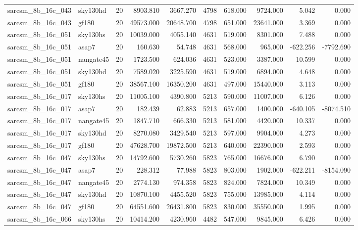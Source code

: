 \begin{longtable}{llrrrrrrrr}
sarcsm\_8b\_16c\_043 & sky130hd & 20 & 8903.810 & 3667.270 & 4798 & 618.000 & 9724.000 & 5.042 & 0.000 \\
sarcsm\_8b\_16c\_043 & gf180 & 20 & 49573.000 & 20648.700 & 4798 & 651.000 & 23641.000 & 3.369 & 0.000 \\
sarcsm\_8b\_16c\_051 & sky130hs & 20 & 10039.000 & 4055.140 & 4631 & 519.000 & 8301.000 & 7.488 & 0.000 \\
sarcsm\_8b\_16c\_051 & asap7 & 20 & 160.630 & 54.748 & 4631 & 568.000 & 965.000 & -622.256 & -7792.690 \\
sarcsm\_8b\_16c\_051 & nangate45 & 20 & 1723.500 & 624.036 & 4631 & 523.000 & 3387.000 & 10.599 & 0.000 \\
sarcsm\_8b\_16c\_051 & sky130hd & 20 & 7589.020 & 3225.590 & 4631 & 519.000 & 6894.000 & 4.648 & 0.000 \\
sarcsm\_8b\_16c\_051 & gf180 & 20 & 38567.100 & 16350.200 & 4631 & 497.000 & 15440.000 & 3.113 & 0.000 \\
sarcsm\_8b\_16c\_017 & sky130hs & 20 & 11005.100 & 4390.800 & 5213 & 590.000 & 11007.000 & 6.126 & 0.000 \\
sarcsm\_8b\_16c\_017 & asap7 & 20 & 182.439 & 62.883 & 5213 & 657.000 & 1400.000 & -640.105 & -8074.510 \\
sarcsm\_8b\_16c\_017 & nangate45 & 20 & 1847.710 & 666.330 & 5213 & 581.000 & 4420.000 & 10.337 & 0.000 \\
sarcsm\_8b\_16c\_017 & sky130hd & 20 & 8270.080 & 3429.540 & 5213 & 597.000 & 9904.000 & 4.273 & 0.000 \\
sarcsm\_8b\_16c\_017 & gf180 & 20 & 47628.700 & 19872.500 & 5213 & 640.000 & 22390.000 & 2.593 & 0.000 \\
sarcsm\_8b\_16c\_047 & sky130hs & 20 & 14792.600 & 5730.260 & 5823 & 765.000 & 16676.000 & 6.790 & 0.000 \\
sarcsm\_8b\_16c\_047 & asap7 & 20 & 228.312 & 77.988 & 5823 & 803.000 & 1902.000 & -622.211 & -8154.090 \\
sarcsm\_8b\_16c\_047 & nangate45 & 20 & 2774.130 & 974.358 & 5823 & 824.000 & 7824.000 & 10.349 & 0.000 \\
sarcsm\_8b\_16c\_047 & sky130hd & 20 & 10870.100 & 4455.520 & 5823 & 755.000 & 13985.000 & 4.114 & 0.000 \\
sarcsm\_8b\_16c\_047 & gf180 & 20 & 64551.600 & 26431.800 & 5823 & 830.000 & 35550.000 & 1.995 & 0.000 \\
sarcsm\_8b\_16c\_066 & sky130hs & 20 & 10414.200 & 4230.960 & 4482 & 547.000 & 9845.000 & 6.426 & 0.000 \\

\end{longtable}
